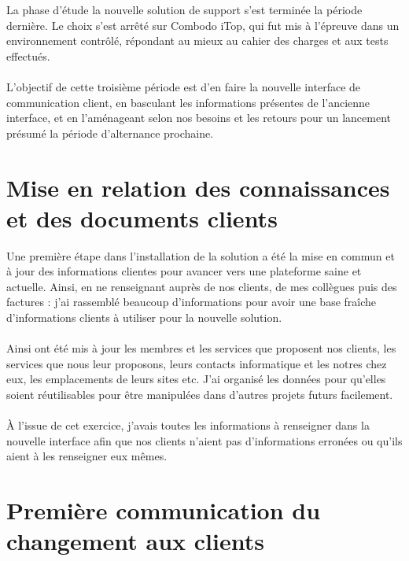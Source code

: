 \renewcommand{\figurename}{}

La phase d'étude la nouvelle solution de support s'est terminée la période dernière. Le choix s'est arrêté sur Combodo iTop, qui fut mis à l'épreuve dans un environnement contrôlé, répondant au mieux au cahier des charges et aux tests effectués.
\\ \\
L'objectif de cette troisième période est d'en faire la nouvelle interface de communication client, en basculant les informations présentes de l'ancienne interface, et en l'aménageant selon nos besoins et les retours pour un lancement présumé la période d'alternance prochaine.

\section{Mise en relation des connaissances et des documents clients}

Une première étape dans l'installation de la solution a été la mise en commun et à jour des informations clientes pour avancer vers une plateforme saine et actuelle. Ainsi, en ne renseignant auprès de nos clients, de mes collègues puis des factures : j'ai rassemblé beaucoup d'informations pour avoir une base fraîche d'informations clients à utiliser pour la nouvelle solution.
\\ \\
Ainsi ont été mis à jour les membres et les services que proposent nos clients, les services que nous leur proposons, leurs contacts informatique et les notres chez eux, les emplacements de leurs sites etc. J'ai organisé les données pour qu'elles soient réutilisables pour être manipulées dans d'autres projets futurs facilement.
\\ \\
À l'issue de cet exercice, j'avais toutes les informations à renseigner dans la nouvelle interface afin que nos clients n'aient pas d'informations erronées ou qu'ils aient à les renseigner eux mêmes.

\section{Première communication du changement aux clients}

